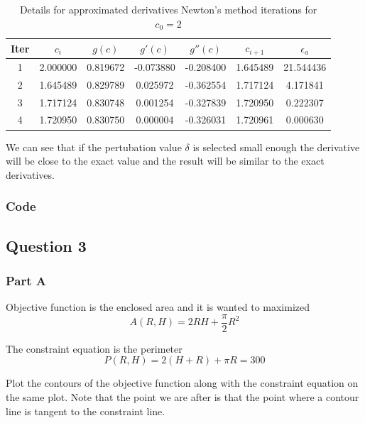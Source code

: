 \documentclass[12pt, a4paper]{article}
\numberwithin{equation}{section}
\begin{document}
\begin{table}[htbp]
  \centering
  \caption{Details for approximated derivatives Newton's method iterations for $c_0 = 2$}
  \begin{tabular}{ccccccc}
    \hline
    Iter & $c_i$ & $g(c)$ & $g'(c)$ & $g''(c)$ & $c_{i+1}$ & $\epsilon_a$ \\ \hline
    1 & 2.000000 & 0.819672 & -0.073880 & -0.208400 & 1.645489 & 21.544436 \\
    2 & 1.645489 & 0.829789 & 0.025972 & -0.362554 & 1.717124 & 4.171841\\
    3 & 1.717124 & 0.830748 & 0.001254 & -0.327839 & 1.720950 & 0.222307\\
    4 & 1.720950 & 0.830750 & 0.000004 & -0.326031 & 1.720961 & 0.000630\\
    \hline
  \end{tabular}
\end{table}

We can see that if the pertubation value $\delta$ is selected small enough the derivative will be close to the exact value and the result will be similar to the exact derivatives.

\subsubsection{Code}





\newpage
\subsection{Question 3}

\subsubsection{Part A}
Objective function is the enclosed area and it is wanted to maximized
\begin{equation}
A(R, H)=2 R H+\frac{\pi}{2} R^2
\end{equation}

The constraint equation is the perimeter
\begin{equation}
P(R, H)=2(H+R)+\pi R=300
\label{eq:constraint}
\end{equation}

Plot the contours of the objective function along with the constraint equation on the same plot. Note that the point we are after is that the point where a contour line is tangent to the constraint line.
\end{document}
